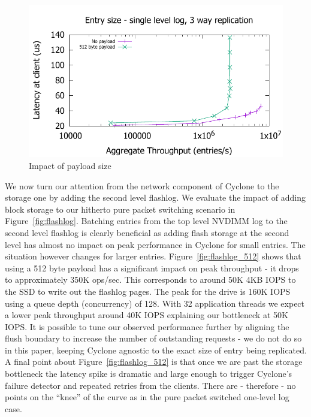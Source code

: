 \documentclass[pageno]{jpaper}
\begin{document}
\begin{figure}
\includegraphics[scale=0.6]{results2/512.pdf}
\caption{Impact of payload size}
\label{fig:payload}
\end{figure}

We now turn our attention from the network component of Cyclone to the storage
one by adding the second level flashlog. We evaluate the impact of adding
block storage to our hitherto pure packet switching scenario in
Figure~\ref{fig:flashlog}. Batching entries from the top level NVDIMM log to the
second level flashlog is clearly beneficial as adding flash storage at the
second level has almost no impact on peak performance in Cyclone for small
entries. The situation however changes for larger
entries. Figure~\ref{fig:flashlog_512} shows that using a 512 byte payload has a
significant impact on peak throughput - it drops to approximately 350K
ops/sec. This corresponds to around 50K 4KB IOPS to the SSD to write out the
flashlog pages. The peak for the drive is 160K IOPS using a queue depth
(concurrency) of 128. With 32 application threads we expect a lower peak
throughput around 40K IOPS explaining our bottleneck at 50K IOPS.  It is
possible to tune our observed performance further by aligning the flush boundary
to increase the number of outstanding requests - we do not do so in this paper,
keeping Cyclone agnostic to the exact size of entry being replicated. A final
point about Figure~\ref{fig:flashlog_512} is that once we are past the storage
bottleneck the latency spike is dramatic and large enough to trigger Cyclone's
failure detector and repeated retries from the clients. There are - therefore -
no points on the ``knee'' of the curve as in the pure packet switched one-level
log case.
\end{document}
